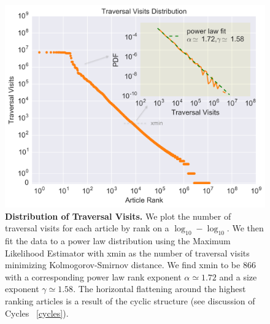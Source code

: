 \documentclass[pre,twocolumn,twoside,superscriptaddress,floatfix]{revtex4-1}
\begin{document}
{\begin{figure}[tp!]
  \includegraphics[width=\columnwidth]{fig008_traversals_per_article.pdf} 
  \caption{
    \textbf{Distribution of Traversal Visits.}
    We plot the number of traversal visits for each article by rank on a $\log_{10}-\log_{10}$. We then fit the data to a power law 
    distribution using the Maximum Likelihood Estimator with xmin as the number of traversal visits minimizing Kolmogorov-Smirnov distance. We find xmin to be 866 with a corresponding power law rank exponent $\alpha \simeq 1.72$ and a size exponent $\gamma \simeq 1.58$.
The horizontal flattening around the highest
ranking articles is a result of the cyclic structure (see discussion of Cycles ~\ref{cycles}).
}
  \label{fig:Distribution of Visits}
\end{figure}

}
\end{document}
